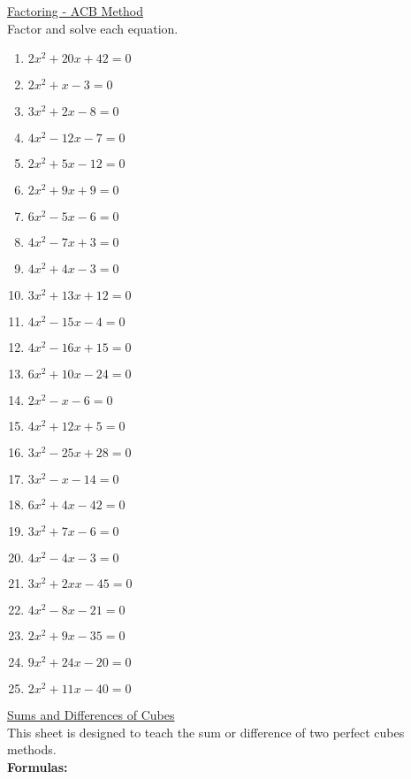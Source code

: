 \documentclass{article}
\begin{document}
\underline{Factoring - ACB Method} \\
Factor and solve each equation. \\
\begin{enumerate}
\item $2x^{2} + 20x + 42 = 0$
\item $2x^{2} + x - 3 = 0$
\item $3x^{2} + 2x - 8 = 0$
\item $4x^{2} - 12x - 7 = 0$
\item $2x^{2} + 5x - 12 = 0$
\item $2x^{2} + 9x + 9 = 0$
\item $6x^{2} - 5x - 6 = 0$
\item $4x^{2} - 7x + 3 = 0$
\item $4x^{2} + 4x - 3 = 0$
\item $3x^{2} + 13x + 12 = 0$
\item $4x^{2} - 15x - 4 = 0$
\item $4x^{2} - 16x + 15 = 0$
\item $6x^{2} + 10x - 24 = 0$
\item $2x^{2} - x - 6 = 0$
\item $4x^{2} + 12x + 5 = 0$
\item $3x^{2} - 25x + 28 = 0$
\item $3x^{2} - x - 14 = 0$
\item $6x^{2} + 4x - 42 = 0$
\item $3x^{2} + 7x - 6 = 0$
\item $4x^{2} - 4x - 3 = 0$
\item $3x^{2} + 2xx - 45 = 0$
\item $4x^{2} - 8x - 21 = 0$
\item $2x^{2} + 9x - 35 =0$
\item $9x^{2} + 24x - 20 = 0$
\item $2x^{2} + 11x - 40 = 0$
\end{enumerate}
\underline{Sums and Differences of Cubes} \\
This sheet is designed to teach the sum or difference of two perfect cubes methods. \\
\textbf{Formulas:} \\
\end{document}
